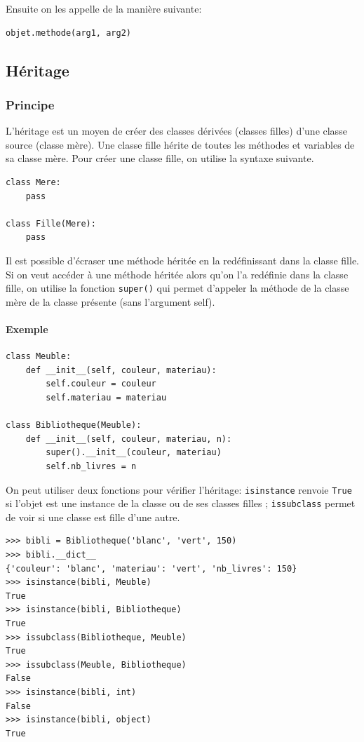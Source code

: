 \documentclass[a4paper, 10pt]{article}
\begin{document}
Ensuite on les appelle de la manière suivante:
\begin{verbatim}
objet.methode(arg1, arg2)
\end{verbatim}


\subsection{Héritage}

\subsubsection{Principe}

L'héritage est un moyen de créer des classes dérivées (classes filles) d'une classe source (classe mère). Une classe fille hérite de toutes les méthodes et variables de sa classe mère. Pour créer une classe fille, on utilise la syntaxe suivante.

\begin{verbatim}
class Mere:
    pass

class Fille(Mere):
    pass
\end{verbatim}

Il est possible d'écraser une méthode héritée en la redéfinissant dans la classe fille. Si on veut accéder à une méthode héritée alors qu'on l'a redéfinie dans la classe fille, on utilise la fonction \texttt{super()} qui permet d'appeler la méthode de la classe mère de la classe présente (sans l'argument self).

\paragraph{Exemple}
\begin{verbatim}
class Meuble:
    def __init__(self, couleur, materiau):
        self.couleur = couleur
        self.materiau = materiau

class Bibliotheque(Meuble):
    def __init__(self, couleur, materiau, n):
        super().__init__(couleur, materiau)
        self.nb_livres = n
\end{verbatim}
On peut utiliser deux fonctions pour vérifier l'héritage: \texttt{isinstance} renvoie \texttt{True} si l'objet est une instance de la classe ou de ses classes filles ; \texttt{issubclass} permet de voir si une classe est fille d'une autre.

\begin{Verbatim}[frame=single, fontsize=\footnotesize]
>>> bibli = Bibliotheque('blanc', 'vert', 150)
>>> bibli.__dict__
{'couleur': 'blanc', 'materiau': 'vert', 'nb_livres': 150}
>>> isinstance(bibli, Meuble)
True
>>> isinstance(bibli, Bibliotheque)
True
>>> issubclass(Bibliotheque, Meuble)
True
>>> issubclass(Meuble, Bibliotheque)
False
>>> isinstance(bibli, int)
False
>>> isinstance(bibli, object)
True
\end{Verbatim}
\end{document}
